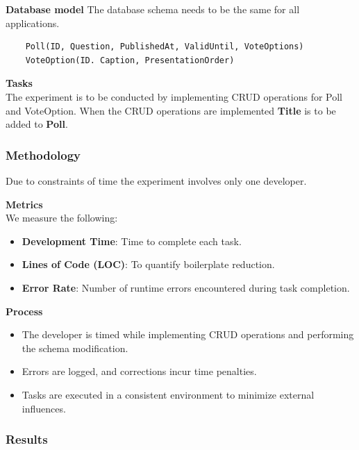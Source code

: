 \textbf{Database model}
The database schema needs to be the same for all applications.
\begin{verbatim}
	Poll(ID, Question, PublishedAt, ValidUntil, VoteOptions)
	VoteOption(ID. Caption, PresentationOrder)
\end{verbatim}

\textbf{Tasks} \\
The experiment is to be conducted by implementing CRUD operations for Poll and VoteOption.
When the CRUD operations are implemented \textbf{Title} is to be added to \textbf{Poll}.

\subsubsection{Methodology}
Due to constraints of time the experiment involves only one developer.

\textbf{Metrics} \\
We measure the following:
\begin{itemize}
	\item \textbf{Development Time}: Time to complete each task.
	\item \textbf{Lines of Code (LOC)}: To quantify boilerplate reduction.
	\item \textbf{Error Rate}: Number of runtime errors encountered during task completion.
\end{itemize}

\textbf{Process} \\
\begin{itemize}
	\item The developer is timed while implementing CRUD operations and performing the schema modification.
	\item Errors are logged, and corrections incur time penalties.
	\item Tasks are executed in a consistent environment to minimize external influences.
\end{itemize}

\subsubsection{Results}




